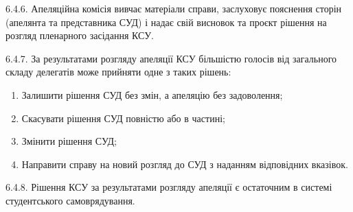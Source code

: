     6.4.6. Апеляційна комісія вивчає матеріали справи, заслуховує пояснення сторін (апелянта та представника СУД) і надає свій висновок та проєкт рішення на розгляд пленарного засідання КСУ.

    6.4.7. За результатами розгляду апеляції КСУ більшістю голосів від загального складу делегатів може прийняти одне з таких рішень:

        \begin{enumerate}[label=\alph*)]
            \item Залишити рішення СУД без змін, а апеляцію без задоволення;
            \item Скасувати рішення СУД повністю або в частині;
            \item Змінити рішення СУД;
            \item Направити справу на новий розгляд до СУД з наданням відповідних вказівок.
        \end{enumerate}
        
    6.4.8. Рішення КСУ за результатами розгляду апеляції є остаточним в системі студентського самоврядування. 